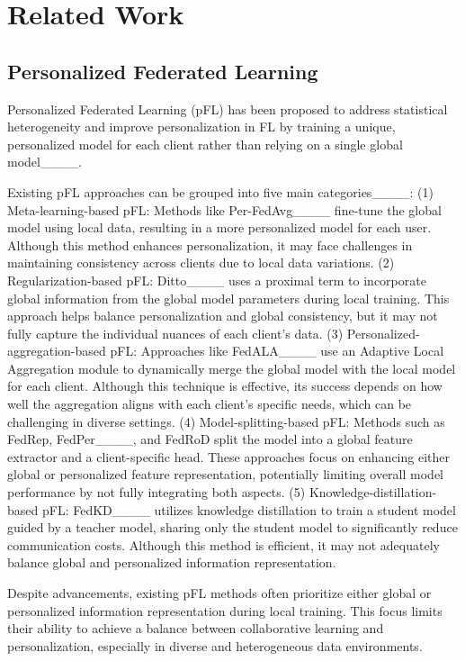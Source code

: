 \section{Related Work}
\subsection{Personalized Federated Learning}
Personalized Federated Learning (pFL) has been proposed to address statistical heterogeneity and improve personalization in FL by training a unique, personalized model for each client rather than relying on a single global model____. 

Existing pFL approaches can be grouped into five main categories____: (1) Meta-learning-based pFL: Methods like Per-FedAvg____ fine-tune the global model using local data, resulting in a more personalized model for each user. Although this method enhances personalization, it may face challenges in maintaining consistency across clients due to local data variations. (2) Regularization-based pFL: Ditto____ uses a proximal term to incorporate global information from the global model parameters during local training. This approach helps balance personalization and global consistency, but it may not fully capture the individual nuances of each client's data. (3) Personalized-aggregation-based pFL: Approaches like FedALA____ use an Adaptive Local Aggregation module to dynamically merge the global model with the local model for each client. Although this technique is effective, its success depends on how well the aggregation aligns with each client’s specific needs, which can be challenging in diverse settings. (4) Model-splitting-based pFL: Methods such as FedRep, FedPer____, and FedRoD split the model into a global feature extractor and a client-specific head. These approaches focus on enhancing either global or personalized feature representation, potentially limiting overall model performance by not fully integrating both aspects. (5) Knowledge-distillation-based pFL: FedKD____ utilizes knowledge distillation to train a student model guided by a teacher model, sharing only the student model to significantly reduce communication costs. Although this method is efficient, it may not adequately balance global and personalized information representation.

Despite advancements, existing pFL methods often prioritize either global or personalized information representation during local training. This focus limits their ability to achieve a balance between collaborative learning and personalization, especially in diverse and heterogeneous data environments.

